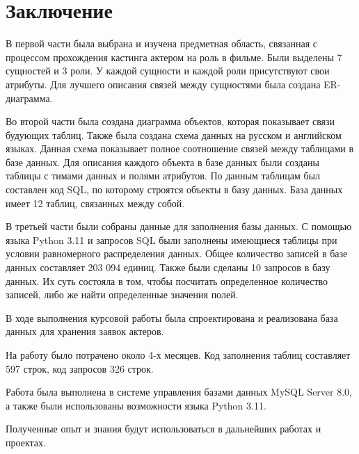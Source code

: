 \documentclass[11pt,a4paper,final]{article} %
\begin{document}


\newpage
\section*{Заключение}

\par В первой части была выбрана и изучена предметная область, связанная с процессом прохождения кастинга актером на роль в фильме. Были выделены 7 сущностей и 3 роли. У каждой сущности и каждой роли присутствуют свои атрибуты. Для лучшего описания связей между сущностями была создана ER-диаграмма.

\par Во второй части была создана диаграмма объектов, которая показывает связи будующих таблиц. Также была создана схема данных на русском и английском языках. Данная схема показывает полное соотношение связей между таблицами в базе данных. Для описания каждого объекта в базе данных были созданы таблицы с тимами данных и полями атрибутов. По данным таблицам был составлен код SQL, по которому строятся объекты в базу данных. База данных имеет 12 таблиц, связанных между собой.

\par В третьей части были собраны данные для заполнения базы данных. С помощью языка Python 3.11 и запросов SQL были заполнены имеющиеся таблицы при условии равномерного распределения данных. Общее количество записей в базе данных составляет 203 094 единиц. Также были сделаны 10 запросов в базу данных. Их суть состояла в том, чтобы посчитать определенное количество записей, либо же найти определенные значения полей. 

\par В ходе выполнения курсовой работы была спроектирована и реализована база данных для хранения заявок актеров. 

\par На работу было потрачено около 4-х месяцев. Код заполнения таблиц составляет 597 строк, код запросов 326 строк. 

\par Работа была выполнена в системе управления базами данных MySQL Server 8.0, а также были использованы возможности языка Python 3.11.

\par Полученные опыт и знания будут использоваться в дальнейших работах и проектах. 
\newpage
\end{document}

